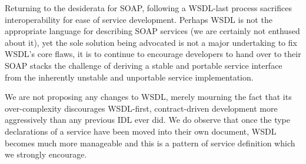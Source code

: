 Returning to the desiderata for SOAP, following a WSDL-last process
sacrifices interoperability for ease of service development. Perhaps
WSDL is not the appropriate language for describing SOAP services (we
are certainly not enthused about it), yet the sole solution being
advocated is not a major undertaking to fix WSDL's core flaws, it is
to continue to encourage developers to hand over to their SOAP stacks
the challenge of deriving a stable and portable service interface from
the inherently unstable and unportable service implementation.

We are not proposing any changes to WSDL, merely mourning the fact
that its over-complexity discourages WSDL-first, contract-driven
development more aggressively than any previous IDL ever did. We do
observe that once the type declarations of a service have been moved
into their own document, WSDL becomes much more manageable and this is
a pattern of service definition which we strongly encourage.
